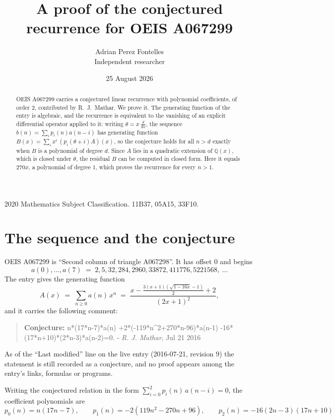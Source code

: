 \documentclass[11pt,a4paper]{article}
\title{A proof of the conjectured recurrence for OEIS A067299}
\author{Adrian Perez Fontelles\\ \small Independent researcher}
\date{25 August 2026}
\theoremstyle{plain}
\theoremstyle{definition}
\begin{document}
\maketitle

\begin{abstract}
OEIS A067299 carries a conjectured linear recurrence with polynomial coefficients, of
order 2, contributed by R.~J.~Mathar. We prove it. The generating function of the
entry is algebraic, and the recurrence is equivalent to the vanishing of an explicit
differential operator applied to it: writing $\theta=x\,\frac{d}{dx}$, the sequence
$b(n)=\sum_{i}p_{i}(n)a(n-i)$ has generating function
$B(x)=\sum_{i}x^{i}\,(p_{i}(\theta+i)A)(x)$, so the conjecture holds for all $n>d$ exactly
when $B$ is a polynomial of degree $d$. Since $A$ lies in a quadratic extension of
$\mathbb{Q}(x)$, which is closed under $\theta$, the residual $B$ can be computed in
closed form. Here it equals $270 x$, a polynomial of degree $1$, which proves
the recurrence for every $n>1$.
\end{abstract}

\noindent\small 2020 Mathematics Subject Classification. 11B37, 05A15, 33F10.\normalsize

\section{The sequence and the conjecture}

OEIS A067299 is ``Second column of triangle A067298''. It has offset $0$ and begins
\[
a(0),\dots,a(7)\;=\;2, 5, 32, 284, 2960, 33872, 411776, 5221568,\ \dots
\]
The entry gives the generating function
\begin{equation}\label{eq:gf}
A(x)\;=\;\sum_{n\ge 0} a(n)\,x^{n}\;=\;\frac{x - \frac{3 \left(x + 1\right) \left(\sqrt{1 - 16 x} - 1\right)}{2} + 2}{\left(2 x + 1\right)^{2}} ,
\end{equation}
and it carries the following comment:
\begin{quote}\small
\textbf{Conjecture:} n*(17*n-7)*a(n) +2*(-119*n\^{}2+270*n-96)*a(n-1) -16*(17*n+10)*(2*n-3)*a(n-2)=0. - \emph{R. J. Mathar}, Jul 21 2016
\end{quote}
As of the ``Last modified'' line on the live entry (2016-07-21, revision 9) the
statement is still recorded as a conjecture, and no proof appears among the entry's links,
formulas or programs.

Writing the conjectured relation in the form $\sum_{i=0}^{2}p_{i}(n)\,a(n-i)=0$,
the coefficient polynomials are
\[
p_{0}(n)=n \left(17 n - 7\right),\qquad p_{1}(n)=- 2 \left(119 n^{2} - 270 n + 96\right),\qquad p_{2}(n)=- 16 \left(2 n - 3\right) \left(17 n + 10\right)
\]
\end{document}
